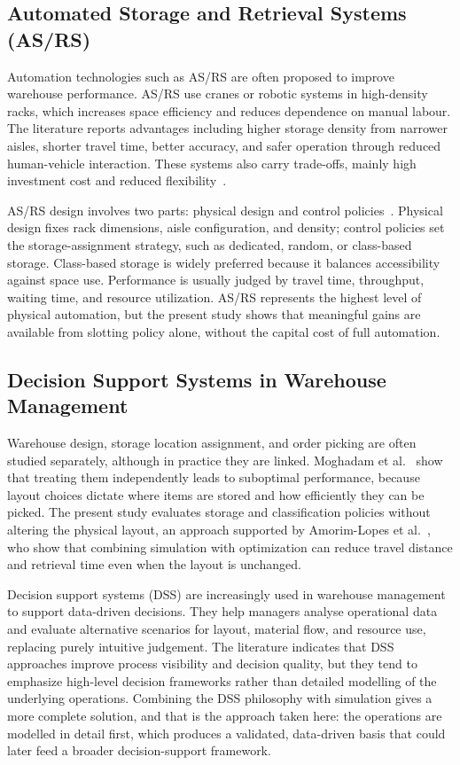 \documentclass[conference]{IEEEtran}
\begin{document}
\subsection{Automated Storage and Retrieval Systems (AS/RS)}
Automation technologies such as AS/RS are often proposed to improve warehouse
performance. AS/RS use cranes or robotic systems in high-density racks, which
increases space efficiency and reduces dependence on manual labour. The
literature reports advantages including higher storage density from narrower
aisles, shorter travel time, better accuracy, and safer operation through
reduced human-vehicle interaction. These systems also carry trade-offs,
mainly high investment cost and reduced flexibility~\cite{roodbergen2009}.

AS/RS design involves two parts: physical design and control
policies~\cite{roodbergen2009}. Physical design fixes rack dimensions, aisle
configuration, and density; control policies set the storage-assignment
strategy, such as dedicated, random, or class-based storage. Class-based
storage is widely preferred because it balances accessibility against space
use. Performance is usually judged by travel time, throughput, waiting time,
and resource utilization. AS/RS represents the highest level of physical
automation, but the present study shows that meaningful gains are available
from slotting policy alone, without the capital cost of full automation.

\subsection{Decision Support Systems in Warehouse Management}
Warehouse design, storage location assignment, and order picking are often
studied separately, although in practice they are linked. Moghadam et
al.~\cite{moghadam2025} show that treating them independently leads to
suboptimal performance, because layout choices dictate where items are stored
and how efficiently they can be picked. The present study evaluates storage
and classification policies without altering the physical layout, an approach
supported by Amorim-Lopes et al.~\cite{amorim2021}, who show that combining
simulation with optimization can reduce travel distance and retrieval time
even when the layout is unchanged.

Decision support systems (DSS) are increasingly used in warehouse management
to support data-driven decisions. They help managers analyse operational data
and evaluate alternative scenarios for layout, material flow, and resource
use, replacing purely intuitive judgement. The literature indicates that DSS
approaches improve process visibility and decision quality, but they tend to
emphasize high-level decision frameworks rather than detailed modelling of the
underlying operations. Combining the DSS philosophy with simulation gives a
more complete solution, and that is the approach taken here: the operations
are modelled in detail first, which produces a validated, data-driven basis
that could later feed a broader decision-support framework.
\end{document}
